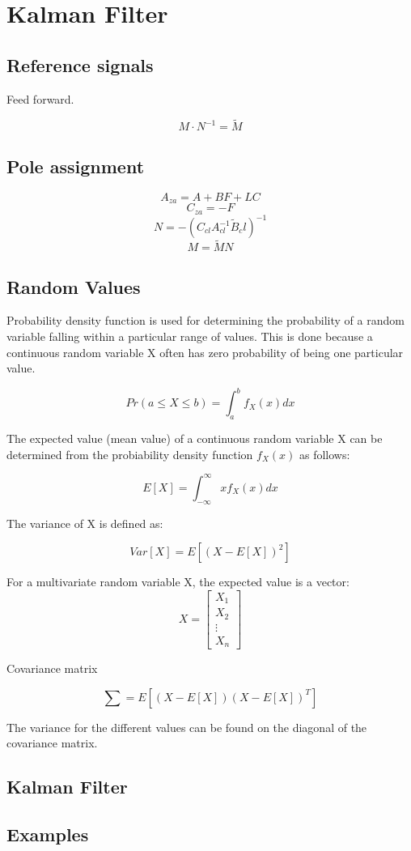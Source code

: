 \section{Kalman Filter}

\subsection{Reference signals}

Feed forward.


$$M \cdot N^{-1} = \tilde M$$

\subsection{Pole assignment}

$$A_{za} = A + BF + LC$$
$$C_{za} = -F$$
$$N = -(C_{cl}A_{cl}^{-1}\tilde B_cl)^{-1}$$
$$M = \tilde M N$$

\subsection{Random Values}

Probability density function is used for determining
the probability of a random variable falling within a particular range of values.
This is done because a continuous random variable X often has zero probability of being one particular value.

$$ Pr(a \leq X \leq b) = \int_{a}^{b} f_X(x) dx $$


The expected value (mean value) of a continuous random variable X
can be determined from the probiability density function $f_X(x)$ as follows:

$$ E[X] = \int_{-\infty}^{\infty} x f_X(x) dx $$

The variance of X is defined as:

$$ Var[X] = E[(X - E[X])^2] $$


For a multivariate random variable X, the expected value is a vector:
$$ X = \begin{bmatrix} X_1 \\ X_2 \\ \vdots \\ X_n \end{bmatrix} $$

Covariance matrix

$$ \sum = E[(X - E[X])(X - E[X])^T] $$

The variance for the different values can be found on the diagonal of the covariance matrix.



\subsection{Kalman Filter}



\subsection{Examples}

